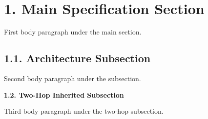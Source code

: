 \documentclass[11pt,a4paper]{article}
\begin{document}
\section{1. Main Specification Section}

First body paragraph under the main section.

\subsection{1.1. Architecture Subsection}

Second body paragraph under the subsection.

\textbf{1.2. Two-Hop Inherited Subsection}

Third body paragraph under the two-hop subsection.
\end{document}
